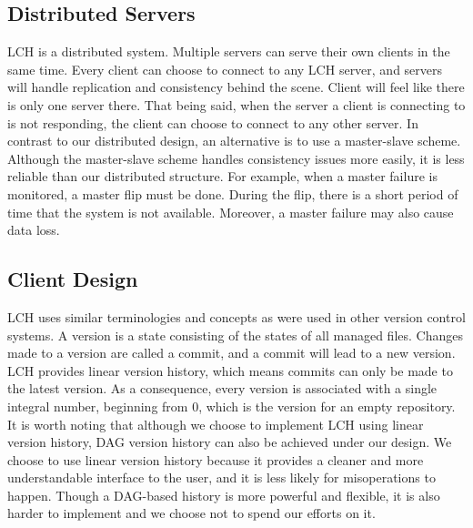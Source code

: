\documentclass[11pt]{article}
\begin{document}
\subsection{Distributed Servers}
LCH is a distributed system.
Multiple servers can serve their own clients in the same time.
Every client can choose to connect to any LCH server, and servers will handle replication and consistency behind the scene.
Client will feel like there is only one server there.
That being said, when the server a client is connecting to is not responding, the client can choose to connect to any other server.
In contrast to our distributed design, an alternative is to use a master-slave scheme.
Although the master-slave scheme handles consistency issues more easily, it is less reliable than our distributed structure.
For example, when a master failure is monitored, a master flip must be done.
During the flip, there is a short period of time that the system is not available.
Moreover, a master failure may also cause data loss.

\subsection{Client Design}
LCH uses similar terminologies and concepts as were used in other version control systems.
A version is a state consisting of the states of all managed files.
Changes made to a version are called a commit, and a commit will lead to a new version.
LCH provides linear version history, which means commits can only be made to the latest version.
As a consequence, every version is associated with a single integral number, beginning from $0$, which is the version for an empty repository.
It is worth noting that although we choose to implement LCH using linear version history, DAG version history can also be achieved under our design.
We choose to use linear version history because it provides a cleaner and more understandable interface to the user, and it is less likely for misoperations to happen.
Though a DAG-based history is more powerful and flexible, it is also harder to implement and we choose not to spend our efforts on it.
\end{document}
